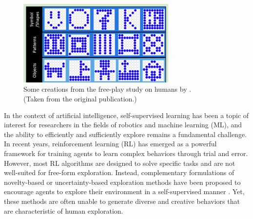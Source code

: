 \begin{figure}[h]
    \centering
    \includegraphics[width=0.7\textwidth]{images/diggs.png}
    \captionsetup{justification=centering}
    \caption[Some creations from the free-play study on humans by \cite{diggs}.]{Some creations from the free-play study on humans by \cite{diggs}.\\(Taken from the original publication.)}
    \label{fig:diggs}
\end{figure}


In the context of artificial intelligence, self-supervised learning has been a topic of interest for researchers in the fields of robotics and machine learning (ML), and the ability to efficiently and sufficiently explore remains a fundamental challenge.
In recent years, reinforcement learning (RL) has emerged as a powerful framework for training agents to learn complex behaviors through trial and error.
However, most RL algorithms are designed to solve specific tasks and are not well-suited for free-form exploration.
Instead, complementary formulations of novelty-based or uncertainty-based exploration methods have been proposed to encourage agents to explore their environment in a self-supervised manner \citep{rnd,icm,disagreement,exploration_survey}. 
Yet, these methods are often unable to generate diverse and creative behaviors that are characteristic of human exploration.




